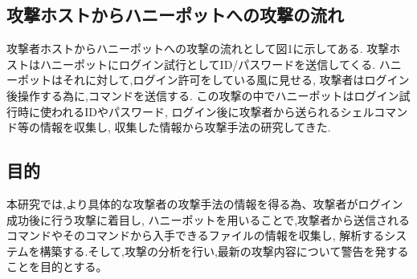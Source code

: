 \documentclass{entry}
\begin{document}
\subsection{攻撃ホストからハニーポットへの攻撃の流れ}
攻撃者ホストからハニーポットへの攻撃の流れとして図1に示してある.
攻撃ホストはハニーポットにログイン試行としてID/パスワードを送信してくる.
ハニーポットはそれに対して,ログイン許可をしている風に見せる,
攻撃者はログイン後操作する為に,コマンドを送信する.
この攻撃の中でハニーポットはログイン試行時に使われるIDやパスワード,
ログイン後に攻撃者から送られるシェルコマンド等の情報を収集し,
収集した情報から攻撃手法の研究してきた.　
\subsection{目的}
本研究では,より具体的な攻撃者の攻撃手法の情報を得る為、攻撃者がログイン成功後に行う攻撃に着目し,
ハニーポットを用いることで,攻撃者から送信されるコマンドやそのコマンドから入手できるファイルの情報を収集し,
解析するシステムを構築する.そして,攻撃の分析を行い,最新の攻撃内容について警告を発することを目的とする。
\end{document}
